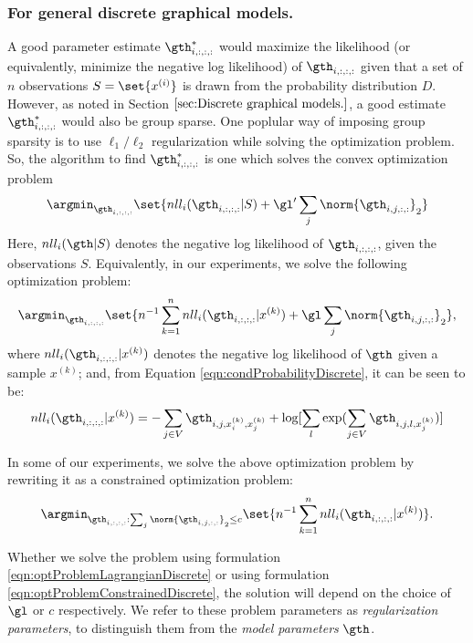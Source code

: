 \documentclass{article}
\begin{document}
\subsubsection{For general discrete graphical models.}
A good parameter estimate $\gth_{i, :, :, :}^*$ would maximize the likelihood (or equivalently, minimize the negative log likelihood) of $\gth_{i, :, :, :}$ given that a set of $n$ observations $S = \set{x^{(i)}}$ is drawn from the probability distribution $D$. However, as noted in Section $\ref{sec:Discrete graphical models.}$,
a good estimate $\gth_{i, :, :, :}^*$ would also be group sparse. One poplular way of imposing group sparsity is to use $\ell_1/\ell_2$ regularization while solving the optimization problem. So, the algorithm to find $\gth_{i, :, :, :}^*$ is one which solves the convex optimization problem $$\argmin_{\gth_{i, :, :, :}} \set{nll_i(\gth_{i, :, :, :} | S) + \gl' \sum_{j} \norm{\gth_{i, j, :, :}}_2}$$
Here, $nll_i(\gth|S)$ denotes the negative log likelihood of $\gth_{i, :, :, :}$, given the observations $S$. Equivalently, in our experiments, we solve the following optimization problem:
\begin{equation}
\argmin_{\gth_{i, :, :, :}} \set{n^{-1} \sum_{k=1}^{n}nll_i(\gth_{i, :, :, :} |x^{(k)}) + \gl \sum_{j} \norm{\gth_{i, j, :, :}}_2},
\label{eqn:optProblemLagrangianDiscrete}
\end{equation}
where $nll_i(\gth_{i, :, :, :}|x^{(k)})$ denotes the negative log likelihood of $\gth$ given a sample $x^{(k)}$; and, from Equation \ref{eqn:condProbabilityDiscrete}, it can be seen to be:
$$nll_i(\gth_{i, :, :, :}|x^{(k)}) = - \sum_{j\in V} \gth_{i, j, x_i^{(k)}, x_j^{(k)}} + \log[\sum_l \exp(\sum_{j \in V}\gth_{i, j, l, x_j^{(k)}})]$$

In some of our experiments, we solve the above optimization problem by rewriting it as a constrained optimization problem:
\begin{equation}
\argmin_{\gth_{i, :, :, :}:  \sum_{j} \norm{\gth_{i, j, :, :}}_2 \leq c} \set{n^{-1} \sum_{k=1}^{n}nll_i(\gth_{i, :, :, :} |x^{(k)})}.
\label{eqn:optProblemConstrainedDiscrete}
\end{equation}

Whether we solve the problem using formulation \ref{eqn:optProblemLagrangianDiscrete} or using formulation \ref{eqn:optProblemConstrainedDiscrete}, the solution will depend on the choice of $\gl$ or $c$ respectively. We refer to these problem parameters as \textit{regularization parameters}, to distinguish them from the \textit{model parameters} $\gth$.
\end{document}
